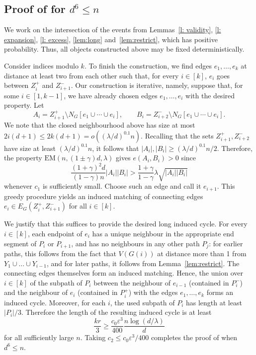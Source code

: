 \documentclass[reqno,a4paper]{amsart}
\theoremstyle{definition}
\newcommand{\eps}{\varepsilon}
\newcommand{\EM}{\mathrm{EM}}
\begin{document}
\subsection{\texorpdfstring{Proof of  for $d^6\le n$}{Proof of Theorem~1.1 for sparse graphs}}\label{s: proof_d<<n}

We work on the intersection of the events from Lemmas~\ref{l: validity}, \ref{l: expansion}, \ref{l: excess}, \ref{lem:long} and~\ref{lem:restrict}, which has positive probability. Thus, all objects constructed above may be fixed deterministically.

Consider indices modulo $k$. To finish the construction, we find edges $e_1,\ldots,e_k$ at distance at least two from each other such that, for every $i\in [k]$, $e_i$ goes between $Z_i^+$ and $Z_{i+1}^-$.
Our construction is iterative, namely, suppose that, for some $i\in [1,k-1]$, we have already chosen edges $e_1,\ldots,e_i$ with the desired property.
Let
\[
    A_i=Z_{i+1}^+\setminus N_G[e_1\cup\cdots\cup e_i],
    \qquad
    B_i=Z_{i+2}^-\setminus N_G[e_1\cup\cdots\cup e_i].
\]
We note that the closed neighbourhood above has size at most $2i(d+1)\le 2k(d+1) = o((\lambda/d)^{0.1}n)$. 
Recalling that the sets $Z_{i+1}^+,Z_{i+2}^-$ have size at least $(\lambda/d)^{0.1}n$, it follows that $|A_i|,|B_i|\ge (\lambda/d)^{0.1}n/2$. 
Therefore, the property $\EM(n,(1\pm \gamma)d,\lambda)$ gives $e(A_i,B_i)>0$ since
\[
    \frac{(1+\gamma)^2d}{(1-\gamma)n}|A_i||B_i|>\frac{1+\gamma}{1-\gamma}\lambda\sqrt{|A_i||B_i|}
\]
whenever $c_1$ is sufficiently small. Choose such an edge and call it $e_{i+1}$. This greedy procedure yields an induced matching of connecting edges $e_i\in E_G(Z_i^+,Z_{i+1}^-)$ for all $i\in[k]$.

We justify that this suffices to provide the desired long induced cycle.
For every $i\in [k]$, each endpoint of $e_i$ has a unique neighbour in the appropriate end segment of $P_i$ or $P_{i+1}$, and has no neighbours in any other path $P_j$: for earlier paths, this follows from the fact that $V(G(i))$ at distance more than 1 from $Y_1\cup\ldots\cup Y_{i-1}$, and for later paths, it follows from Lemma~\ref{lem:restrict}. 
The connecting edges themselves form an induced matching. 
Hence, the union over $i\in [k]$ of the subpath of $P_i$ between the neighbour of $e_{i-1}$ (contained in $P_i^-$) and the neighbour of $e_i$ (contained in $P_i^+$) with the edges $e_1,\ldots,e_k$ forms an induced cycle. 
Moreover, for each $i$, the used subpath of $P_i$ has length at least $|P_i|/3$. Therefore the length of the resulting induced cycle is at least
\[
    \frac{k r}{3}
    \ge \frac{c_0\eps^3}{400}\frac{n\log(d/\lambda)}{d}
\]
for all sufficiently large $n$. Taking $c_2\le c_0\eps^3/400$ completes the proof of  when $d^6\le n$.
\end{document}
